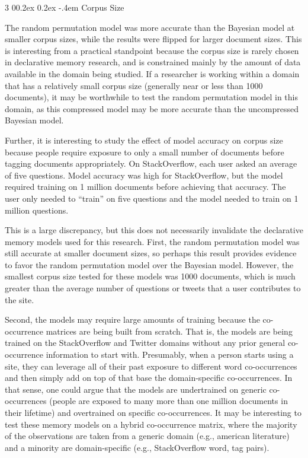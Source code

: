 \documentclass[man,floatsintext,donotrepeattitle]{apa6}
\makeatletter
\renewcommand{\subsubsection}{%
  \@startsection
  {subsubsection}%
  {3}%
  {\parindent}%
  {0\baselineskip \@plus 0.2ex \@minus 0.2ex}%
  {-.4em}%
  {\normalfont\normalsize\bfseries\addperi}}
\makeatother
\begin{document}
\subsubsection{Corpus Size}

The random permutation model was more accurate than the Bayesian model at smaller corpus sizes, while the results were flipped for larger document sizes.
This is interesting from a practical standpoint because the corpus size is rarely chosen in declarative memory research, and is constrained mainly by the amount of data available in the domain being studied.
If a researcher is working within a domain that has a relatively small corpus size (generally near or less than \num{1000} documents),
it may be worthwhile to test the random permutation model in this domain, as this compressed model may be more accurate than the uncompressed Bayesian model.

Further, it is interesting to study the effect of model accuracy on corpus size because people require exposure to only a small number of documents before tagging documents appropriately.
On StackOverflow, each user asked an average of five questions.
Model accuracy was high for StackOverflow, but the model required training on 1 million documents before achieving that accuracy.
The user only needed to ``train'' on five questions and the model needed to train on 1 million questions.

This is a large discrepancy, but this does not necessarily invalidate the declarative memory models used for this research.
First, the random permutation model was still accurate at smaller document sizes, so perhaps this result provides evidence to favor the random permutation model over the Bayesian model.
However, the smallest corpus size tested for these models was \num{1000} documents, which is much greater than the average number of questions or tweets that a user contributes to the site.

Second, the models may require large amounts of training because the co-occurrence matrices are being built from scratch.
That is, the models are being trained on the StackOverflow and Twitter domains without any prior general co-occurrence information to start with.
Presumably, when a person starts using a site, they can leverage all of their past exposure to different word co-occurrences and then simply add on top of that base the domain-specific co-occurrences.
In that sense, one could argue that the models are undertrained on generic co-occurrences (people are exposed to many more than one million documents in their lifetime) and overtrained on specific co-occurrences.
It may be interesting to test these memory models on a hybrid co-occurrence matrix,
where the majority of the observations are taken from a generic domain (e.g., american literature) and a minority are domain-specific (e.g., StackOverflow word, tag pairs).
\end{document}
